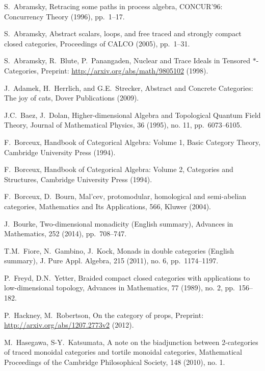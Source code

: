 \documentclass[11pt,oneside,article]{memoir}
\begin{document}
\begin{thebibliography}{XXX}

 S.~Abramsky, Retracing some paths in process algebra, CONCUR'96: Concurrency Theory (1996), pp.~1--17.

 S.~Abramsky, Abstract scalars, loops, and free traced and strongly compact closed categories, Proceedings of CALCO (2005), pp.~1--31.

 S.~Abramsky, R.~Blute, P.~Panangaden, Nuclear and Trace Ideals in Tensored $*$-Categories, Preprint: \url{http://arxiv.org/abs/math/9805102} (1998).

 J.~Adamek, H.~Herrlich, and G.E.~Strecker, Abstract and Concrete Categories: The joy of cats, Dover Publications (2009).

 J.C.~Baez, J.~Dolan, Higher-dimensional Algebra and Topological Quantum Field Theory, Journal of Mathematical Physics, 36 (1995), no. 11, pp.~6073--6105.

F.~Borceux, Handbook of Categorical Algebra: Volume 1, Basic Category Theory, Cambridge University Press (1994).

 F.~Borceux, Handbook of Categorical Algebra: Volume 2, Categories and Structures, Cambridge University Press (1994).

 F.~Borceux, D.~Bourn, Mal'cev, protomodular, homological and semi-abelian categories, Mathematics
 and Its Applications, 566, Kluwer (2004).

 J.~Bourke, Two-dimensional monadicity (English summary), Advances in Mathematics, 252 (2014), pp.~708--747.
 
 T.M.~Fiore, N.~Gambino, J.~Kock, Monads in double categories (English summary), J. Pure Appl. Algebra, 215 (2011), no. 6, pp.~1174--1197. 

 P.~Freyd, D.N.~Yetter, Braided compact closed categories with applications to low-dimensional topology,
Advances in Mathematics, 77 (1989), no. 2, pp.~156--182.

 P.~Hackney, M.~Robertson, On the category of props, Preprint: \url{http://arxiv.org/abs/1207.2773v2} (2012).

M.~Hasegawa, S-Y.~Katsumata, A note on the biadjunction between 2-categories of traced monoidal categories and tortile monoidal categories, Mathematical Proceedings of the Cambridge Philosophical Society, 148 (2010), no. 1.


\end{thebibliography}
\end{document}
